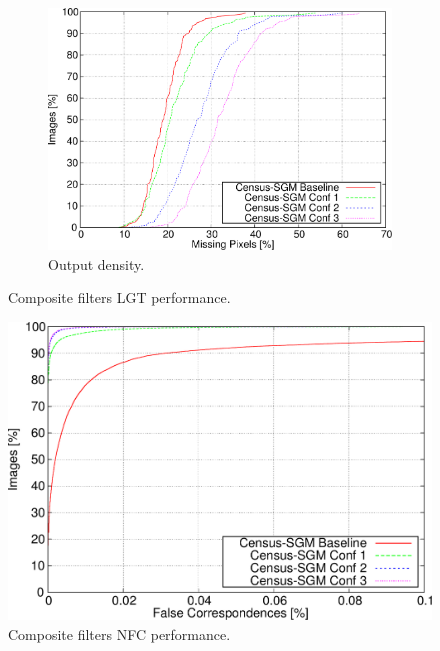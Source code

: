 \begin{figure}
  \ContinuedFloat
  \begin{subfigure}[h]{\textwidth}
    \centering
    \includegraphics[width=\textwidth, trim=0 0 0 0,clip]{comp_dens}
    \caption{ Output density. }
    \label{fig:cp03_composite_LGT_dens}
  \end{subfigure}%
  \caption{ Composite filters LGT performance. }
\end{figure}

\begin{figure}[h]
  \centering
  \includegraphics[width=\textwidth, trim=0 0 0 0,clip]{comp_nfc_perc}
  \caption{ Composite filters NFC performance.}
  \label{fig:cp03_composite_NFC}
\end{figure}%

